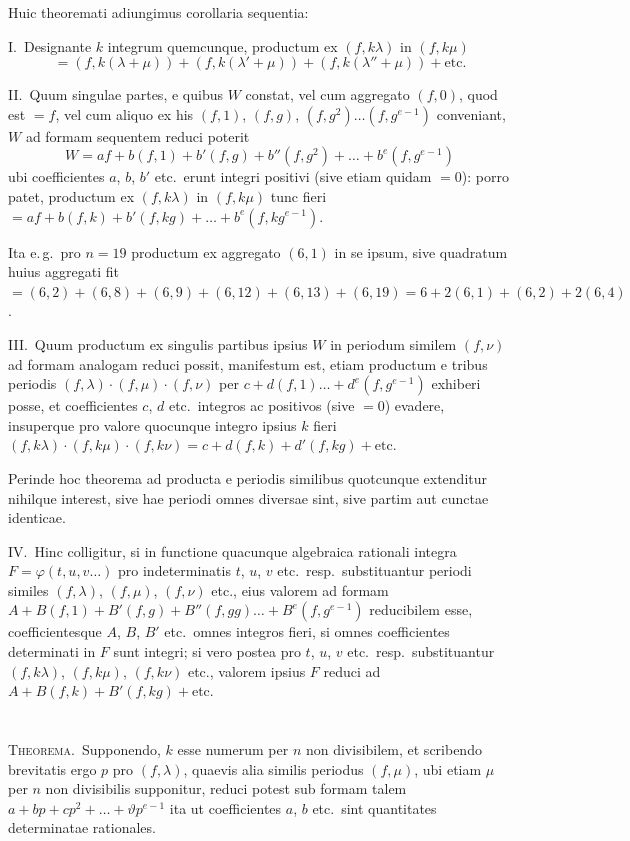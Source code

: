 \documentclass[12pt,a4paper]{article}
\theoremstyle{plain}
\theoremstyle{definition}
\theoremstyle{remark}
\begin{document}
Huic theoremati adiungimus corollaria sequentia:

\textsc{I.}\ Designante $k$ integrum quemcunque, productum ex $(f,k\lambda)$ in $(f,k\mu)$
\[=(f,k(\lambda+\mu))+(f,k(\lambda'+\mu))+(f,k(\lambda''+\mu))+\text{etc.}\]

\textsc{II.}\ Quum singulae partes, e quibus $W$ constat, vel cum aggregato $(f,0)$, quod est $=f$, vel cum aliquo ex his $(f,1)$, $(f,g)$, $(f,g^2)\ldots(f,g^{e-1})$ conveniant, $W$ ad formam sequentem reduci poterit
\[W=af+b(f,1)+b'(f,g)+b''(f,g^2)+\ldots+b^e(f,g^{e-1})\]
ubi coefficientes $a$, $b$, $b'$ etc.\ erunt integri positivi (sive etiam quidam $=0$): porro patet, productum ex $(f,k\lambda)$ in $(f,k\mu)$ tunc fieri $=af+b(f,k)+b'(f,kg)+\ldots+b^e(f,kg^{e-1})$.

Ita e.\,g.\ pro $n=19$ productum ex aggregato $(6,1)$ in se ipsum, sive quadratum huius aggregati fit $=(6,2)+(6,8)+(6,9)+(6,12)+(6,13)+(6,19)=6+2(6,1)+(6,2)+2(6,4)$.

\textsc{III.}\ Quum productum ex singulis partibus ipsius $W$ in periodum similem $(f,\nu)$ ad formam analogam reduci possit, manifestum est, etiam productum e tribus periodis $(f,\lambda)\cdot(f,\mu)\cdot(f,\nu)$ per $c+d(f,1)\ldots+d^e(f,g^{e-1})$ exhiberi posse, et coefficientes $c$, $d$ etc.\ integros ac positivos (sive $=0$) evadere, insuperque pro valore quocunque integro ipsius $k$ fieri $(f,k\lambda)\cdot(f,k\mu)\cdot(f,k\nu)=c+d(f,k)+d'(f,kg)+\text{etc.}$

Perinde hoc theorema ad producta e periodis similibus quotcunque extenditur nihilque interest, sive hae periodi omnes diversae sint, sive partim aut cunctae identicae.

\textsc{IV.}\ Hinc colligitur, si in functione quacunque algebraica rationali integra $F=\varphi(t,u,v\ldots)$ pro indeterminatis $t$, $u$, $v$ etc.\ resp.\ substituantur periodi similes $(f,\lambda)$, $(f,\mu)$, $(f,\nu)$ etc., eius valorem ad formam $A+B(f,1)+B'(f,g)+B''(f,gg)\ldots+B^e(f,g^{e-1})$ reducibilem esse, coefficientesque $A$, $B$, $B'$ etc.\ omnes integros fieri, si omnes coefficientes determinati in $F$ sunt integri; si vero postea pro $t$, $u$, $v$ etc.\ resp.\ substituantur $(f,k\lambda)$, $(f,k\mu)$, $(f,k\nu)$ etc., valorem ipsius $F$ reduci ad $A+B(f,k)+B'(f,kg)+\text{etc.}$

\section{}

\textsc{Theorema.}\ Supponendo, $k$ esse numerum per $n$ non divisibilem, et scribendo brevitatis ergo $p$ pro $(f,\lambda)$, quaevis alia similis periodus $(f,\mu)$, ubi etiam $\mu$ per $n$ non divisibilis supponitur, reduci potest sub formam talem $a+bp+cp^2+\ldots+\vartheta p^{e-1}$ ita ut coefficientes $a$, $b$ etc.\ sint quantitates determinatae rationales.
\end{document}

